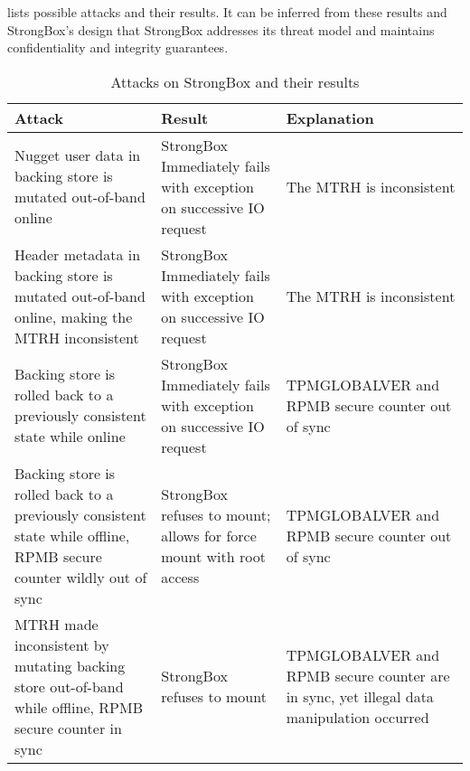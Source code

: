  lists possible attacks and their results. It can be inferred
from these results and StrongBox's design that StrongBox addresses its threat
model and maintains confidentiality and integrity guarantees.

\begin{table}[t]
  \caption{Attacks on StrongBox and their results} \label{tbl:sb-security}
  \footnotesize
  \centering
  \begin{tabu} to \linewidth { | X[l] | X[c] | X[c] | }
    \hline
    \textbf{Attack} & \textbf{Result} & \textbf{Explanation} \\
    \hline\hline
    Nugget user data in backing store is mutated out-of-band online & StrongBox Immediately fails with exception on successive IO request & The MTRH is inconsistent \\
    \hline
    Header metadata in backing store is mutated out-of-band online, making the MTRH inconsistent & StrongBox Immediately fails with exception on successive IO request & The MTRH is inconsistent \\
    \hline
    Backing store is rolled back to a previously consistent state while online & StrongBox Immediately fails with exception on successive IO request & TPMGLOBALVER and RPMB secure counter out of sync \\
    \hline
    Backing store is rolled back to a previously consistent state while offline, RPMB secure counter wildly out of sync & StrongBox refuses to mount; allows for force mount with root access & TPMGLOBALVER and RPMB secure counter out of sync \\
    \hline
    MTRH made inconsistent by mutating backing store out-of-band while offline, RPMB secure counter in sync & StrongBox refuses to mount & TPMGLOBALVER and RPMB secure counter are in sync, yet illegal data manipulation occurred \\
    \hline\hline
  \end{tabu}
\end{table}
